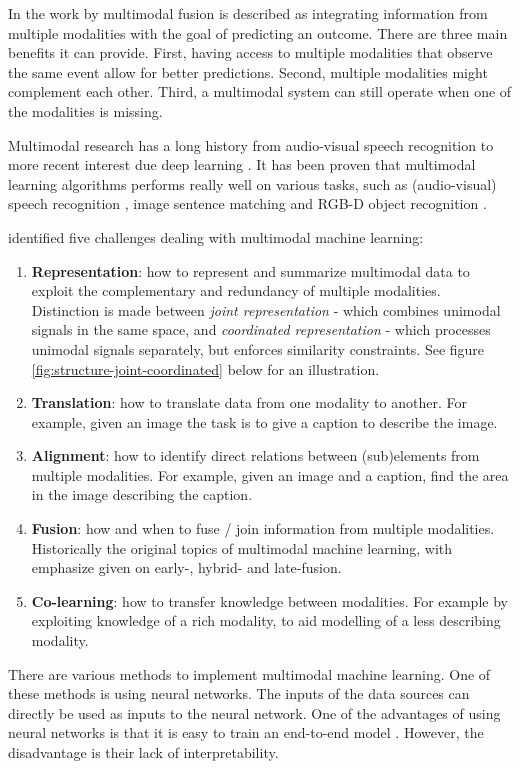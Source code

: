 In the work by  multimodal fusion is described as integrating information from multiple modalities with the goal of predicting an outcome. There are three main benefits it can provide. First, having access to multiple modalities that observe the same event allow for better predictions. Second, multiple modalities might complement each other. Third, a multimodal system can still operate when one of the modalities is missing. 

Multimodal research has a long history from audio-visual speech recognition to more recent interest due deep learning \cite{Ngiam2011}. It has been proven that multimodal learning algorithms performs really well on various tasks, such as (audio-visual) speech recognition \cite{Noda2014}, image sentence matching \cite{Ma2015} and RGB-D object recognition \cite{Eitel2015,Xu2017,Sindagi2019}.

 identified five challenges dealing with multimodal machine learning:
\begin{enumerate}
\item \textbf{Representation}: how to represent and summarize multimodal data to exploit the complementary and redundancy of multiple modalities. Distinction is made between \textit{joint representation} - which combines unimodal signals in the same space, and \textit{coordinated representation} - which processes unimodal signals separately, but enforces similarity constraints. See figure \ref{fig:structure-joint-coordinated} below for an illustration.
\item \textbf{Translation}: how to translate data from one modality to another. For example, given an image the task is to give a caption to describe the image.
\item \textbf{Alignment}: how to identify direct relations between (sub)elements from multiple modalities. For example, given an image and a caption, find the area in the image describing the caption.
\item \textbf{Fusion}: how and when to fuse / join information from multiple modalities. Historically the original topics of multimodal machine learning, with emphasize given on early-, hybrid- and late-fusion.
\item \textbf{Co-learning}: how to transfer knowledge between modalities. For example by exploiting knowledge of a rich modality, to aid modelling of a less describing modality.
\end{enumerate}

There are various methods to implement multimodal machine learning. One of these methods is using neural networks. The inputs of the data sources can directly be used as inputs to the neural network. One of the advantages of using neural networks is that it is easy to train an end-to-end model \cite{Ngiam2011,Baltrusaitis2017}. However, the disadvantage is their lack of interpretability. 

